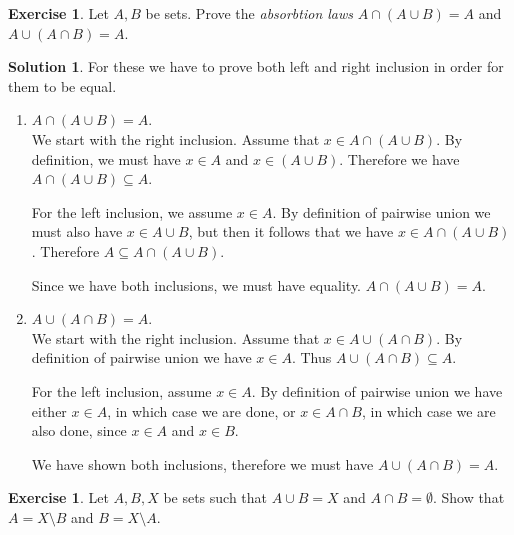 \documentclass[a4paper, twocolumn]{report}
\newcounter{exercise} \numberwithin{exercise}{section}
\theoremstyle{definition}
\newtheorem{exc}[exercise]{Exercise}
\theoremstyle{solution}
\newtheorem*{sltn}{Solution}
\newcommand{\union}{\cup}
\newcommand{\intrsct}{\cap}
\begin{document}
\begin{exc}
  Let $A, B$ be sets. Prove the \textit{absorbtion laws} $A \intrsct (A \union
  B) = A$ and $A \union (A \intrsct B) = A$. 
\end{exc}

\begin{sltn}
  For these we have to prove both left and right inclusion in order for them to be equal.

  \begin{enumerate}
    \item $A \intrsct (A \union B) = A$. \\
      [0.2cm]
      We start with the right inclusion. Assume that $x \in A \intrsct (A
      \union B)$. By definition, we must have $x \in A$ and $x \in (A \union
      B)$. Therefore we have $A \intrsct (A \union B) \subseteq A$. 

      For the left inclusion, we assume $x \in A$. By definition of pairwise
      union we must also have $x \in A \union B$, but then it follows that we
      have $x \in A \intrsct (A \union B)$. Therefore $A \subseteq A \intrsct
      (A \union B)$.

      Since we have both inclusions, we must have equality.  $ A
      \intrsct (A \union B) = A$.

    \item $A \union (A \intrsct B) = A$. \\
      [0.2cm]
      We start with the right inclusion. Assume that $x \in A \union (A
      \intrsct B)$.  By definition of pairwise union we have $x \in A$. Thus $A
      \union (A \intrsct B) \subseteq A$.

      For the left inclusion, assume $x \in A$. By definition of pairwise union
      we have either $x \in A$, in which case we are done, or $x \in A \intrsct
      B$, in which case we are also done, since $x \in A$ and $x \in B$.
   
      We have shown both inclusions, therefore we must have $A \union (A
      \intrsct B) = A$.
  \end{enumerate}
\end{sltn}

\begin{exc}
  Let $A, B, X$ be sets such that $A \union B = X$ and $A \intrsct B =
  \emptyset$.  Show that $A = X \setminus B$ and $B = X \setminus A$. 
\end{exc}
\end{document}
